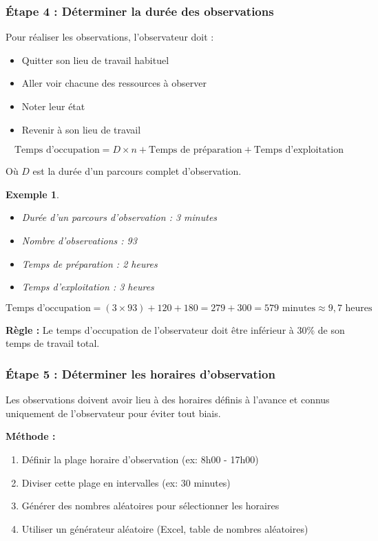 \documentclass[a4paper,12pt]{article}
\newtheorem{exemple}{Exemple}[section]
\begin{document}
\subsubsection{Étape 4 : Déterminer la durée des observations}

Pour réaliser les observations, l'observateur doit :
\begin{itemize}
    \item Quitter son lieu de travail habituel
    \item Aller voir chacune des ressources à observer
    \item Noter leur état
    \item Revenir à son lieu de travail
\end{itemize}

\[
\text{Temps d'occupation} = D \times n + \text{Temps de préparation} + \text{Temps d'exploitation}
\]

Où $D$ est la durée d'un parcours complet d'observation.

\begin{exemple}
\begin{itemize}
    \item Durée d'un parcours d'observation : 3 minutes
    \item Nombre d'observations : 93
    \item Temps de préparation : 2 heures
    \item Temps d'exploitation : 3 heures
\end{itemize}

\[
\text{Temps d'occupation} = (3 \times 93) + 120 + 180 = 279 + 300 = 579 \text{ minutes} \approx 9,7 \text{ heures}
\]
\end{exemple}

\textbf{Règle :} Le temps d'occupation de l'observateur doit être inférieur à 30\% de son temps de travail total.

\subsubsection{Étape 5 : Déterminer les horaires d'observation}

Les observations doivent avoir lieu à des horaires définis à l'avance et connus uniquement de l'observateur pour éviter tout biais.

\textbf{Méthode :}
\begin{enumerate}
    \item Définir la plage horaire d'observation (ex: 8h00 - 17h00)
    \item Diviser cette plage en intervalles (ex: 30 minutes)
    \item Générer des nombres aléatoires pour sélectionner les horaires
    \item Utiliser un générateur aléatoire (Excel, table de nombres aléatoires)
\end{enumerate}
\end{document}
